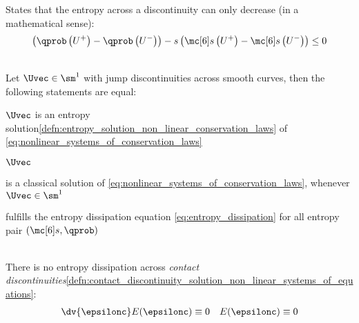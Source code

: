 \begin{defnbox}\nospacing
    \begin{defn}\label{defn:entropy_dissipation}
        States that the entropy across a discontinuity can only decrease (in a mathematical sense):
        \begin{align}
          \left(\qprob \left(U^{+}\right)-\qprob \left(U^{-}\right)\right)-s \left(\entropy\left(U^{+}\right)-\entropy\left(U^{-}\right)\right)
          \leq 0\label{eq:entropy_dissipation}
        \end{align}
    \end{defn}
\end{defnbox}
\begin{defnbox}\nospacing
    \begin{defn}\label{defn:entropy_solution_equivalence}\leavevmode\\
        Let $\Uvec\in\sm^{1}$ with jump discontinuities across smooth curves, then the following statements are equal:
        \begin{itemizenosep}
            \item $\Uvec$ is an entropy solution\cref{defn:entropy_solution_non_linear_conservation_laws} of \cref{eq:nonlinear_systems_of_conservation_laws}
            \item $\Uvec$
            \begin{itemizenosep}
                \item is a classical solution of \cref{eq:nonlinear_systems_of_conservation_laws}, whenever $\Uvec\in\sm^{1}$
                \item fulfills the entropy dissipation equation \cref{eq:entropy_dissipation} for all entropy pair $(\entropy,\qprob)$
            \end{itemizenosep}
        \end{itemizenosep}
    \end{defn}
\end{defnbox}
\begin{propositionbox}\nospacing
    \begin{proposition}\label{proposition:contact_discontinuity_entropy}\leavevmode\\
        There is no entropy dissipation across \textit{contact discontinuities}\cref{defn:contact_discontinuity_solution_non_linear_systems_of_equations}:
        \begin{align}
          \dv{\epsilonc}E(\epsilonc)\equiv0&&E(\epsilonc)\equiv0
        \end{align}
    \end{proposition}
\end{propositionbox}
